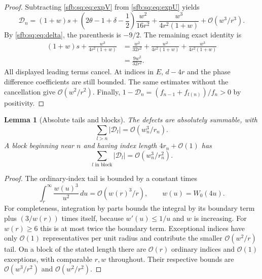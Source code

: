 \documentclass[11pt]{article}
\newtheorem{lemma}[theorem]{Lemma}
\theoremstyle{remark}\newtheorem{remark}[theorem]{Remark}
\newcommand{\OO}{\mathcal O}
\begin{document}
\begin{proof}
Subtracting \eqref{sfb:sq:eq:expV} from \eqref{sfb:sq:eq:expU} yields
\begin{equation}\label{sfb:sq:eq:resbalance}
 \mathcal D_n=(1+w)s+
 \left(2\theta-1+\delta-\frac12\right)\frac{w^2}{16r^2}
 +\frac{w^3}{4r^2(1+w)}+\OO(w^3/r^3).
\end{equation}
By \eqref{sfb:sq:eq:delta}, the parenthesis is $-9/2$. The remaining exact identity is
\begin{equation}\label{sfb:sq:eq:cancel}
 \begin{split}
 (1+w)s+\frac{w^3}{4r^2(1+w)}
 &=\frac{w^2}{32r^2}+\frac{w^2}{4r^2(1+w)}
                         +\frac{w^3}{4r^2(1+w)}\\
 &=\frac{9w^2}{32r^2}.
 \end{split}
\end{equation}
All displayed leading terms cancel. At indices in $E$, $d-4r$ and the phase difference coefficients are still bounded. The same estimates without the cancellation give $\OO(w^2/r^2)$. Finally,
$1-\mathcal D_n=(f_{n-1}+f_{t(n)})/f_n>0$ by positivity.
\end{proof}

\begin{lemma}[Absolute tails and blocks]\label{sfb:sq:lem:tails}
The defects are absolutely summable, with
\begin{equation}\label{sfb:sq:eq:tail}
 \sum_{l>n}|\mathcal D_l|=\OO(w_n^3/r_n).
\end{equation}
A block beginning near $n$ and having index length $4r_n+\OO(1)$ has
\begin{equation}\label{sfb:sq:eq:block}
 \sum_{l\text{ in block}}|\mathcal D_l|=\OO(w_n^3/r_n^2).
\end{equation}
\end{lemma}
\begin{proof}
The ordinary-index tail is bounded by a constant times
\[
 \int_r^\infty\frac{w(u)^3}{u^2}\,du
 =\OO(w(r)^3/r),\qquad w(u)=W_0(4u).
\]
For completeness, integration by parts bounds the integral by its boundary term plus $(3/w(r))$ times itself, because $w'(u)\le1/u$ and $w$ is increasing. For $w(r)\ge6$ this is at most twice the boundary term. Exceptional indices have only $\OO(1)$ representatives per unit radius and contribute the smaller $\OO(w^2/r)$ tail. On a block of the stated length there are $\OO(r)$ ordinary indices and $\OO(1)$ exceptions, with comparable $r,w$ throughout. Their respective bounds are $\OO(w^3/r^2)$ and $\OO(w^2/r^2)$.
\end{proof}
\end{document}
